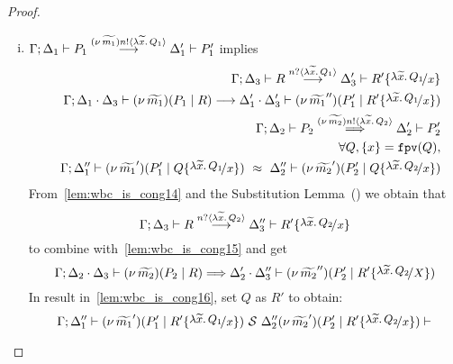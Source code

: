 \begin{proof}
\begin{enumerate}
\begin{enumerate}[i.]
				\item
						$\Gamma; \Delta_1 \vdash P_1 \stackrel{(\nu\, \widetilde{m_1}) n ! \langle \lambda \widetilde{x}.\,Q_1 \rangle}{\longrightarrow} \Delta_1' \vdash P_1'$
						implies
						\begin{eqnarray}
							& & \horel{\Gamma}{\Delta_3}{R}
							{\by{\bactinp{n}{\abs{\widetilde{x}} {Q_1}}}}{\Delta_3'}
							{R' \subst{\abs{\widetilde{x}}{Q_1}}{x}}
							\label{lem:wbc_is_cong14}\\
							& & \horel{\Gamma}{\Delta_1 \cat \Delta_3}{\newsp{\widetilde{m_1}}{P_1 \Par R}}
							{\by{}}{\Delta_1' \cat \Delta_3'}
							{\newsp{\widetilde{m_1}''}{P_1' \Par R' \subst{\abs{\widetilde{x}}{Q_1}}{x}}}
							\nonumber \\
							& & \horel{\Gamma}{\Delta_2}{P_2}
							{\By{\news{\widetilde{m_2}} \bactout{n}{\abs{\widetilde{x}}{Q_2}}}}
							{\Delta_2'}{P_2'}
							\label{lem:wbc_is_cong15}\\
							& & \forall Q, \set{x} = \fpv{Q}, \nonumber \\
							& & \horel{\Gamma}{\Delta_1''}{\newsp{\widetilde{m_1}'}{P_1' \Par Q \subst{\abs{\widetilde{x}}{Q_1}}{x}}}
							{\ \wbc\ }
							{\Delta_2''}{\newsp{\widetilde{m_2}'}{P_2' \Par Q \subst{\abs{\widetilde{x}}{Q_2}}{x}}}
							\label{lem:wbc_is_cong16}
						\end{eqnarray}
						From~\eqref{lem:wbc_is_cong14} and the Substitution Lemma~() we obtain that
						\[
							\horel{\Gamma}{\Delta_3}{R}{\by{\bactinp{n}{\abs{\widetilde{x}} {Q_2}}}}{\Delta_3''}{R' \subst{\abs{\widetilde{x}}{Q_2}}{x}}
						\]
						\noi to combine with~\eqref{lem:wbc_is_cong15} and get
						\[
							\horel{\Gamma}{\Delta_2 \cat \Delta_3}{\newsp{\widetilde{m_2}}{P_2 \Par R}}
							{\By{}}
							{\Delta_2' \cat \Delta_3''}{\newsp{\widetilde{m_2}''}{P_2' \Par R' \subst{\abs{\widetilde{x}}{Q_2}}{X}}}
						\]
						\noi In result in~\eqref{lem:wbc_is_cong16}, set $Q$ as $R'$ to obtain:
						\[
							\horel{\Gamma}{\Delta_1''}{\newsp{\widetilde{m_1}'}{P_1' \Par R' \subst{\abs{\widetilde{x}}{Q_1}}{x}}}
							{\ \mathcal{S}\ \Delta_2''}
							{\newsp{\widetilde{m_2}'}{P_2' \Par R' \subst{\abs{\widetilde{x}}{Q_2}}{x}}}
						\]


\end{enumerate}
\end{enumerate}
\end{proof}
